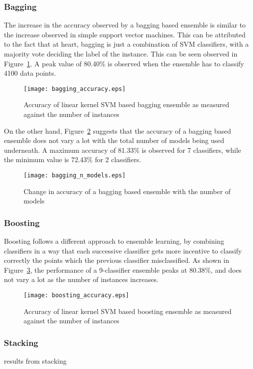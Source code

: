 \subsubsection{Bagging}
The increase in the accuracy observed by a bagging based ensemble is similar to the increase observed in simple support vector machines. This can be attributed to the fact that at heart, bagging is just a combination of SVM classifiers, with a majority vote deciding the label of the instance. This can be seen observed in Figure~\ref{bagging_accuracy}. A peak value of 80.40\% is observed when the ensemble has to classify 4100 data points.
\begin{figure}
    \centering
    \texttt{[image: bagging\_accuracy.eps]}
    \caption{Accuracy of linear kernel SVM based bagging ensemble as measured against the number of instances}
    \label{bagging_accuracy}
\end{figure}

On the other hand, Figure~\ref{bagging_n_models} suggests that the accuracy of a bagging based ensemble does not vary a lot with the total number of models being used underneath. A maximum accuracy of 81.33\% is observed for 7 classifiers, while the minimum value is 72.43\% for 2 classifiers.
\begin{figure}
    \centering
    \texttt{[image: bagging\_n\_models.eps]}
    \caption{Change in accuracy of a bagging based ensemble with the number of models}
    \label{bagging_n_models}
\end{figure}

\subsubsection{Boosting}
Boosting follows a different approach to ensemble learning, by combining classifiers in a way that each successive classifier gets more incentive to classify correctly the points which the previous classifier misclassified. As shown in Figure~\ref{boosting_accuracy}, the performance of a 9-classifier ensemble peaks at 80.38\%, and does not vary a lot as the number of instances increases.
\begin{figure}
    \centering
    \texttt{[image: boosting\_accuracy.eps]}
    \caption{Accuracy of linear kernel SVM based boosting ensemble as measured against the number of instances}
    \label{boosting_accuracy}
\end{figure}

\subsubsection{Stacking}
results from stacking

